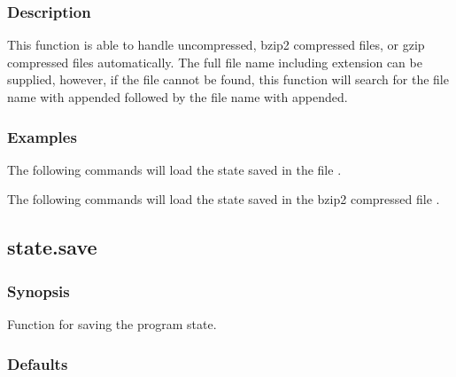   

  
 \subsubsection{Description} 

 This function is able to handle uncompressed, bzip2 compressed files, or gzip compressed files automatically.  The full file name including extension can be supplied, however, if the file cannot be found, this function will search for the file name with  appended followed by the file name with  appended. 
  

  
 \subsubsection{Examples} 

 The following commands will load the state saved in the file . 
  



 The following commands will load the state saved in the bzip2 compressed file . 
  





  

 \newpage 

 \subsection{state.save} 

  
 \subsubsection{Synopsis} 

 Function for saving the program state. 
  

  
 \subsubsection{Defaults} 

